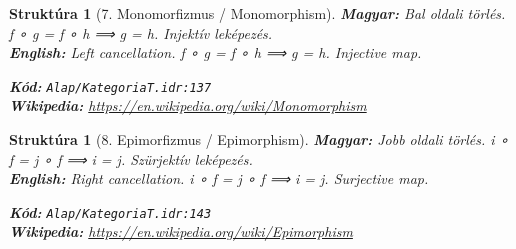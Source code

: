 \documentclass[11pt,a4paper,twocolumn]{article}
\newtheorem{struktura}[tetel]{Struktúra}
\begin{document}
\begin{struktura}[7. Monomorfizmus / Monomorphism]

\textbf{Magyar:} Bal oldali törlés. f ∘ g = f ∘ h ⟹ g = h. Injektív leképezés.\\

\textbf{English:} Left cancellation. f ∘ g = f ∘ h ⟹ g = h. Injective map.\\

\begin{center}
\end{center}

\textbf{Kód:} \texttt{Alap/KategoriaT.idr:137}\\
\textbf{Wikipedia:} \url{https://en.wikipedia.org/wiki/Monomorphism}

\end{struktura}

\vspace{0.5cm}

\begin{struktura}[8. Epimorfizmus / Epimorphism]

\textbf{Magyar:} Jobb oldali törlés. i ∘ f = j ∘ f ⟹ i = j. Szürjektív leképezés.\\

\textbf{English:} Right cancellation. i ∘ f = j ∘ f ⟹ i = j. Surjective map.\\

\begin{center}
\end{center}

\textbf{Kód:} \texttt{Alap/KategoriaT.idr:143}\\
\textbf{Wikipedia:} \url{https://en.wikipedia.org/wiki/Epimorphism}

\end{struktura}

\vspace{0.5cm}
\end{document}
